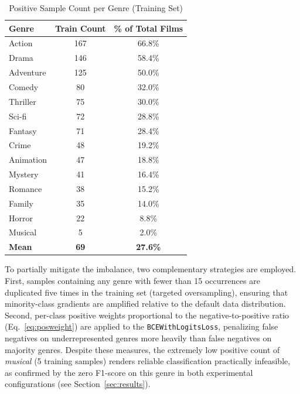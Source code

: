 \documentclass[conference]{IEEEtran}
\begin{document}
\begin{table}[!t]
\caption{Positive Sample Count per Genre (Training Set)}
\label{tab:class_imbalance}
\begin{center}
\small
\begin{tabular}{lcc}
\hline
\textbf{Genre} & \textbf{Train Count} & \textbf{\% of Total Films} \\
\hline
Action      & 167 & 66.8\% \\
Drama       & 146 & 58.4\% \\
Adventure   & 125 & 50.0\% \\
Comedy      &  80 & 32.0\% \\
Thriller    &  75 & 30.0\% \\
Sci-fi      &  72 & 28.8\% \\
Fantasy     &  71 & 28.4\% \\
Crime       &  48 & 19.2\% \\
Animation   &  47 & 18.8\% \\
Mystery     &  41 & 16.4\% \\
Romance     &  38 & 15.2\% \\
Family      &  35 & 14.0\% \\
Horror      &  22 &  8.8\% \\
Musical     &   5 &  2.0\% \\
\hline
\textbf{Mean} & \textbf{69} & \textbf{27.6\%} \\
\hline
\end{tabular}
\end{center}
\end{table}

To partially mitigate the imbalance, two complementary strategies 
are employed. First, samples containing any genre with fewer than 
15 occurrences are duplicated five times in the training set 
(targeted oversampling), ensuring that minority-class gradients 
are amplified relative to the default data distribution. Second, 
per-class positive weights proportional to the negative-to-positive 
ratio (Eq.~\ref{eq:posweight}) are applied to the 
\texttt{BCEWithLogitsLoss}, penalizing false negatives on 
underrepresented genres more heavily than false negatives on 
majority genres. Despite these measures, the extremely low 
positive count of \textit{musical} (5 training samples) renders 
reliable classification practically infeasible, as confirmed by 
the zero F1-score on this genre in both experimental configurations 
(see Section~\ref{sec:results}).
\end{document}
